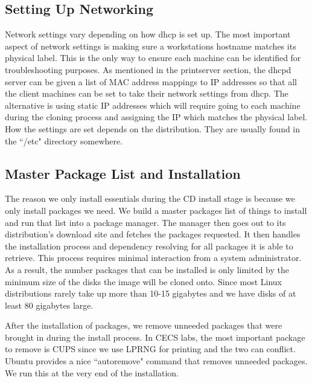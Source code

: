 \subsection{Setting Up Networking}
Network settings vary depending on how dhcp is set up.  The most important aspect of network settings is making sure a workstations hostname matches its physical label.  This is the only way to ensure each machine can be identified for troubleshooting purposes.  As mentioned in the printserver section, the dhcpd server can be given a list of MAC address mappings to IP addresses so that all the client machines can be set to take their network settings from dhcp.  The alternative is using static IP addresses which will require going to each machine during the cloning process and assigning the IP which matches the physical label.  How the settings are set depends on the distribution.  They are usually found in the ``/etc" directory somewhere.  

\subsection{Master Package List and Installation}
The reason we only install essentials during the CD install stage is because we only install packages we need.  We build a master packages list of things to install and run that list into a package manager.  The manager then goes out to its distribution's download site and fetches the packages requested.  It then handles the installation process and dependency resolving for all packages it is able to retrieve.  This process requires minimal interaction from a system administrator.  As a result, the number packages that can be installed is only limited by the minimum size of the disks the image will be cloned onto.  Since most Linux distributions rarely take up more than 10-15 gigabytes and we have disks of at least 80 gigabytes large.  

After the installation of packages, we remove unneeded packages that were brought in during the install process.  In CECS labs, the most important package to remove is CUPS since we use LPRNG for printing and the two can conflict. Ubuntu provides a nice ``autoremove" command that removes unneeded packages. We run this at the very end of the installation. 

